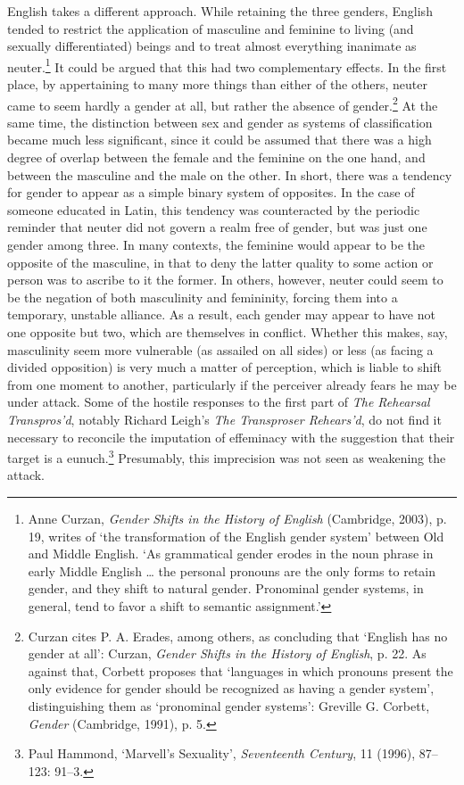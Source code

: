 ﻿\documentclass[12pt]{article}
\newcommand{\citedtitle}[1]{\textit{#1}}
\begin{document}
English takes a different approach. While retaining
the three genders, English tended to restrict the application of masculine and
feminine to living (and sexually differentiated) beings and to treat almost
everything inanimate as neuter.\footnote{Anne Curzan, \citedtitle{Gender
Shifts in the History of English} (Cambridge, 2003), p. 19, writes
of ‘the transformation of the English gender system’ between Old and Middle
English. ‘As grammatical gender erodes in the noun phrase in early Middle
English … the personal pronouns are the only forms to retain gender, and they
shift to natural gender. Pronominal gender systems, in general, tend to favor a
shift to semantic assignment.’}
It could be argued that this had two complementary effects. In the first place,
by appertaining to many more things than either of the others, neuter came to
seem hardly a gender at all, but rather the absence of gender.\footnote{Curzan cites P. A.
Erades, among others, as concluding that ‘English has no gender at all’:
Curzan, \citedtitle{Gender Shifts in the History of English}, p. 22. As against that, Corbett
proposes that ‘languages in which pronouns present the only evidence for gender
should be recognized as having a gender system’, distinguishing them as
‘pronominal gender systems’: Greville G. Corbett, \citedtitle{Gender} (Cambridge, 1991), p.
5.} At the
same time, the distinction between sex and gender as systems of classification
became much less significant, since it could be assumed that there was a high
degree of overlap between the female and the feminine on the one hand, and
between the masculine and the male on the other. In short, there was a tendency
for gender to appear as a simple binary system of opposites. In the case of
someone educated in Latin, this tendency was counteracted by the periodic
reminder that neuter did not govern a realm free of gender, but was just one
gender among three. In many contexts, the feminine would appear to be the
opposite of the masculine, in that to deny the latter quality to some action or
person was to ascribe to it the former. In others, however, neuter could seem
to be the negation of both masculinity and femininity, forcing them into a
temporary, unstable alliance. As a result, each gender may appear to have not
one opposite but two, which are themselves in conflict. Whether this makes,
say, masculinity seem more vulnerable (as assailed on all sides) or less (as
facing a divided opposition) is very much a matter of perception, which is
liable to shift from one moment to another, particularly if the perceiver
already fears he may be under attack. Some of the hostile responses to the
first part of \citedtitle{The
Rehearsal Transpros’d},
notably Richard Leigh’s \citedtitle{The Transproser Rehears’d}, do not find it
necessary to reconcile the imputation of effeminacy with the suggestion that
their target is a eunuch.\footnote{Paul Hammond,
‘Marvell’s Sexuality’, \citedtitle{Seventeenth Century}, 11 (1996), 87–123:
91–3.}
Presumably, this imprecision was not seen as weakening the attack.
\end{document}

